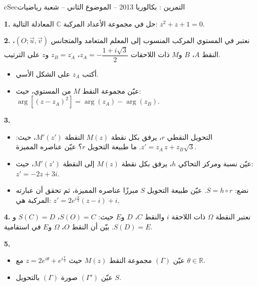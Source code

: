 \documentclass[12pt,a4paper]{article}
\newenvironment{BOX}[2]{\begin{otherlanguage}{english}\begin{arbox}{#1}{#2}}{\end{arbox}\end{otherlanguage}}
\newcounter{exo}
\newenvironment{tamrin}[1]{\stepcounter{exo}\begin{BOX}{cSec}{التمرين \theexo: #1}}{\end{BOX}}
\newcommand{\R}{\mathbb{R}}
\newenvironment{sq}{\begin{itemize}[leftmargin=2.4em,itemsep=3pt]}{\end{itemize}}
\newcommand{\qa}{\item[(أ)]}\newcommand{\qb}{\item[(ب)]}\newcommand{\qc}{\item[(جـ)]}\newcommand{\qd}{\item[(د)]}\newcommand{\qe}{\item[(هـ)]}
\newcommand{\QQ}[1]{\par\smallskip\textbf{#1.} }
\begin{document}
\begin{tamrin}{بكالوريا 2013 -- الموضوع الثاني -- شعبة رياضيات}
\QQ{1} حل في مجموعة الأعداد المركبة $\mathbb C$ المعادلة التالية: $z^2+z+1=0$.
\QQ{2} نعتبر في المستوي المركب المنسوب إلى المعلم المتعامد والمتجانس $(O;\vec u,\vec v)$، النقط $A$، $B$ و$M$ ذات اللاحقات $z_A=-\dfrac{1+i\sqrt3}{2}$، $z_B=\overline{z_A}$ و$z$ على الترتيب.
\begin{sq}
\qa أكتب $z_A$ على الشكل الأسي.
\qb عيّن مجموعة النقط $M$ من المستوي، حيث: $\arg\left[(z-z_A)^2\right]=\arg(z_A)-\arg(z_B)$.
\end{sq}
\QQ{3}
\begin{sq}
\qa التحويل النقطي $r$، يرفق بكل نقطة $M(z)$ النقطة $M'(z')$، حيث: $z'=z_A\,z+z_B\sqrt3$. ما طبيعة التحويل $r$؟ عيّن عناصره المميزة.
\qb عيّن نسبة ومركز التحاكي $h$، يرفق بكل نقطة $M(z)$ إلى النقطة $M'(z')$، حيث: $z'=-2z+3i$.
\qc نضع: $S=h\circ r$. عيّن طبيعة التحويل $S$ مبرزًا عناصره المميزة، ثم تحقق أن عبارته المركبة هي: $z'=2e^{i\frac{\pi}{3}}(z-i)+i$.
\end{sq}
\QQ{4} نعتبر النقطة $\Omega$ ذات اللاحقة $i$ والنقط $C$، $D$ و$E$ حيث: $S(O)=C$، $S(C)=D$ و$S(D)=E$.
بيّن أن النقط $O$، $\Omega$ و$E$ في استقامية.
\QQ{5}
\begin{sq}
\qa عيّن $(\Gamma)$ مجموعة النقط $M(z)$ حيث $z=2e^{i\theta}+e^{i\frac{\pi}{2}}$ مع $\theta\in\R$.
\qb عيّن $(\Gamma')$ صورة $(\Gamma)$ بالتحويل $S$.
\end{sq}
\end{tamrin}
\end{document}
